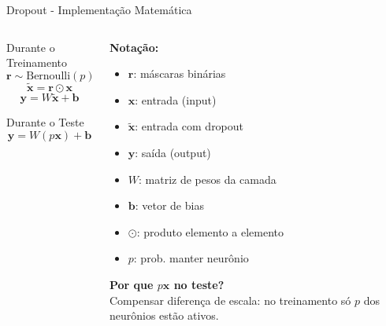 \documentclass{beamer}
\begin{document}
\begin{frame}{Dropout - Implementação Matemática}
\begin{columns}[T]
\begin{column}{0.5\textwidth}
\vspace{0.4cm}
\begin{block}{Durante o Treinamento}
\[
\mathbf{r} \sim \text{Bernoulli}(p)
\]
\[
\tilde{\mathbf{x}} = \mathbf{r} \odot \mathbf{x}
\]
\[
\mathbf{y} = W\tilde{\mathbf{x}} + \mathbf{b}
\]
\end{block}

\begin{block}{Durante o Teste}
\[
\mathbf{y} = W(p\mathbf{x}) + \mathbf{b}
\]
\end{block}
\end{column}

\begin{column}{0.48\textwidth}
\small
\textbf{Notação:}
\begin{itemize}
    \item $\mathbf{r}$: máscaras binárias
    \item $\mathbf{x}$: entrada (input)
    \item $\tilde{\mathbf{x}}$: entrada com dropout
    \item $\mathbf{y}$: saída (output)
    \item $W$: matriz de pesos da camada
    \item $\mathbf{b}$: vetor de bias
    \item $\odot$: produto elemento a elemento
    \item $p$: prob. manter neurônio
\end{itemize}

\textbf{Por que $p\mathbf{x}$ no teste?}\\
Compensar diferença de escala: no treinamento só $p$ dos neurônios estão ativos.
\end{column}
\end{columns}
\end{frame}
\end{document}
